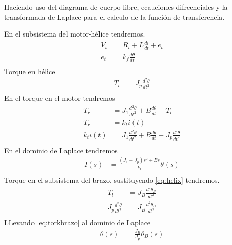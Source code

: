 \documentclass[a4paper]{IEEEtran} %
\begin{document}
Haciendo uso del diagrama de cuerpo libre, ecauciones difreenciales y la transformada de Laplace para el calculo de la función de transferencia. 

En el subsistema del motor-hélice tendremos.
\begin{equation}
    \begin{split}
        V_{s}&=R_{i}+L\frac{di}{dt}+e_{t}\\
        e_{t}&=k_{f}\frac{d\theta}{dt}\\
    \end{split}
    \label{eq:motor}
\end{equation}
Torque en hélice
\begin{equation}
    \begin{split}
        T_{l}&=J_{p}\frac{d^2\theta}{dt^2}\\
    \end{split}
    \label{eq:helix}
\end{equation}
En el torque en el motor tendremos
\begin{equation}
    \begin{split}
        T_{r}&=J_{1}\frac{d^2\theta}{dt^2}+B\frac{d\theta}{dt}+T_{l}\\
        T_{r}&=k_{t}i(t)\\
        k_{t}i(t)&=J_{1}\frac{d^2\theta}{dt^2}+B\frac{d\theta}{dt}+J_{p}\frac{d^2\theta}{dt^2}\\
    \end{split}
        \label{eq:motortork}
\end{equation}
En el dominio de Laplace tendremos
\begin{equation}
    \begin{split}
        I(s)&=\frac{(J_{1}+J_{p})s^2 +Bs}{k_{t}}\theta(s)\\
    \end{split}
    \label{eq:laplas}
\end{equation}
Torque en el subsistema del brazo, sustituyendo \ref{eq:helix} tendremos.
\begin{equation}
    \begin{split}
        T_{l}&=J_{B}\frac{d^2\theta_{B}}{dt^2}\\
        J_{p}\frac{d^2\theta}{dt^2}&=J_{B}\frac{d^2\theta_{B}}{dt^2}\\
    \end{split}
    \label{eq:torkbrazo}
\end{equation}
LLevando \ref{eq:torkbrazo} al dominio de Laplace 
\begin{equation}
    \begin{split}
        \theta(s)&=\frac{J_{B}}{J_{p}}\theta_{B}(s)\\
    \end{split}
    \label{eq:torkbrazoplace}
\end{equation}
\end{document}
